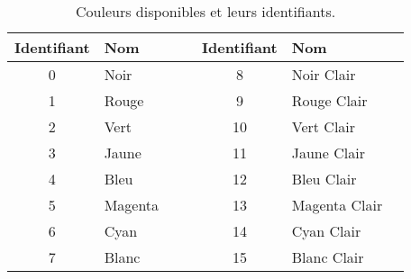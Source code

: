 \documentclass[french, 12pt]{article}
\begin{document}
\renewcommand{\arraystretch}{1.1}
\begin{table}[htp]
      \begin{center}
            \begin{tabular}{clcp{1em}clc}
                  \toprule
                  Identifiant & Nom     &                                   &  & Identifiant & Nom           &                                          \\
                  \midrule
                  0           & Noir    & \cellcolor{black}\hspace{1.5em}   &  & 8           & Noir Clair    & \cellcolor{bright_black}\hspace{1.5em}   \\
                  1           & Rouge   & \cellcolor{red}\hspace{1.5em}     &  & 9           & Rouge Clair   & \cellcolor{bright_red}\hspace{1.5em}     \\
                  2           & Vert    & \cellcolor{green}\hspace{1.5em}   &  & 10          & Vert Clair    & \cellcolor{bright_green}\hspace{1.5em}   \\
                  3           & Jaune   & \cellcolor{yellow}\hspace{1.5em}  &  & 11          & Jaune Clair   & \cellcolor{bright_yellow}\hspace{1.5em}  \\
                  4           & Bleu    & \cellcolor{blue}\hspace{1.5em}    &  & 12          & Bleu Clair    & \cellcolor{bright_blue}\hspace{1.5em}    \\
                  5           & Magenta & \cellcolor{magenta}\hspace{1.5em} &  & 13          & Magenta Clair & \cellcolor{bright_magenta}\hspace{1.5em} \\
                  6           & Cyan    & \cellcolor{cyan}\hspace{1.5em}    &  & 14          & Cyan Clair    & \cellcolor{bright_cyan}\hspace{1.5em}    \\
                  7           & Blanc   & \cellcolor{white}\hspace{1.5em}   &  & 15          & Blanc Clair   & \cellcolor{bright_white}\hspace{1.5em}   \\
                  \bottomrule
            \end{tabular}
      \end{center}
      \caption{Couleurs disponibles et leurs identifiants.}
      \label{tbl:color}
\end{table}
\end{document}
